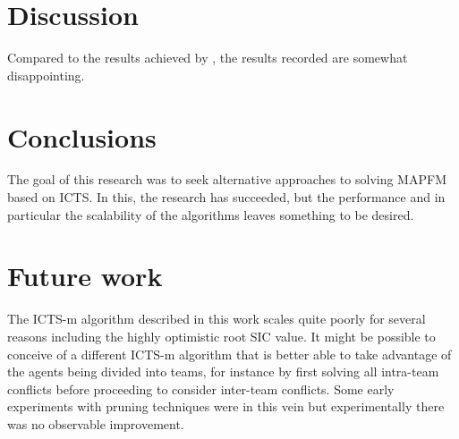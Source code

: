 \documentclass[english]{article}
\begin{document}
	\section{Discussion}
	Compared to the results achieved by \cite{ma2016}, the results recorded are somewhat disappointing.
	\section{Conclusions}
	The goal of this research was to seek alternative approaches to solving MAPFM based on ICTS. In this, the research has succeeded, but the performance and in particular the scalability of the algorithms leaves something to be desired. 
	\section{Future work}
	The ICTS-m algorithm described in this work scales quite poorly for several reasons including the highly optimistic root SIC value. It might be possible to conceive of a different ICTS-m algorithm that is better able to take advantage of the agents being divided into teams, for instance by first solving all intra-team conflicts before proceeding to consider inter-team conflicts. Some early experiments with pruning techniques were in this vein but experimentally there was no observable improvement.
	\printbibliography
	
\end{document}
